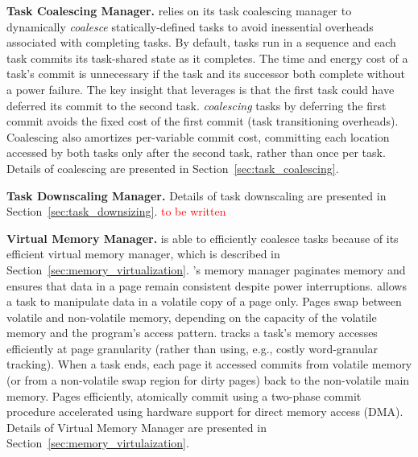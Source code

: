 \textbf{\sys Task Coalescing Manager.} \sys relies on its task coalescing manager to dynamically {\em coalesce} statically\hyp{}defined tasks to avoid inessential overheads associated with completing tasks. By default, tasks run in a sequence and each task commits its task-shared state as it completes.  The time and energy cost of a task's commit is unnecessary if the task and its successor both complete without a power failure. The key insight that \sys leverages is that the first task could have deferred its commit to the second task. {\em coalescing} tasks by deferring the first commit avoids the fixed cost of the first commit (task transitioning overheads). Coalescing also amortizes per-variable commit cost, committing each location accessed by both tasks only after the second task, rather than once per task. Details of coalescing are presented in Section~\ref{sec:task_coalescing}.

\textbf{\sys Task Downscaling Manager.} Details of task downscaling are presented in Section~\ref{sec:task_downsizing}. \textcolor{red}{to be written}
 
\textbf{\sys Virtual Memory Manager.} \sys is able to efficiently coalesce tasks because of its efficient virtual memory manager, which is described in Section~\ref{sec:memory_virtualization}. \sys's memory manager paginates memory and ensures that data in a page remain consistent despite power interruptions. \sys allows a task to manipulate data in a volatile copy of a page only. Pages swap between volatile and non-volatile memory, depending on the capacity of the volatile memory and the program's access pattern. \sys tracks a task's memory accesses efficiently at page granularity (rather than using, e.g., costly word-granular tracking). When a task ends, each page it accessed commits from volatile memory (or from a non-volatile swap region for dirty pages) back to the non-volatile main memory. Pages efficiently, atomically commit using a two-phase commit procedure accelerated using hardware support for direct memory access (DMA). Details of Virtual Memory Manager are presented in Section~\ref{sec:memory_virtulaization}.